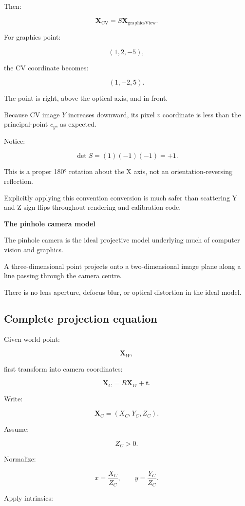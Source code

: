 Then:

\[
 \boxed{ \mathbf X_{\mathrm{CV}}=S\mathbf X_{\mathrm{graphicsView}} }.
\]

For graphics point:

\[
 (1,2,-5),
\]

the CV coordinate becomes:

\[
 \boxed{(1,-2,5)}.
\]

The point is right, above the optical axis, and in front.

Because CV image \(Y\) increases downward, its pixel \(v\) coordinate is less than the principal-point \(c_y\), as expected.

Notice:

\[
 \det S=(1)(-1)(-1)=+1.
\]

This is a proper 180° rotation about the X axis, not an orientation-reversing reflection.

Explicitly applying this convention conversion is much safer than scattering Y and Z sign flips throughout rendering and calibration code.

\textbf{The pinhole camera model}

The pinhole camera is the ideal projective model underlying much of computer vision and graphics.

A three-dimensional point projects onto a two-dimensional image plane along a line passing through the camera centre.

There is no lens aperture, defocus blur, or optical distortion in the ideal model.

\subsection{Complete projection equation}\label{02-foundations-ii-ch035-complete-projection-equation}

Given world point:

\[
 \mathbf X_W,
\]

first transform into camera coordinates:

\[
 \boxed{ \mathbf X_C=R\mathbf X_W+\mathbf t }.
\]

Write:

\[
 \mathbf X_C=(X_C,Y_C,Z_C).
\]

Assume:

\[
 Z_C>0.
\]

Normalize:

\[
 \boxed{ x=\frac{X_C}{Z_C}, \qquad y=\frac{Y_C}{Z_C} }.
\]

Apply intrinsics:


